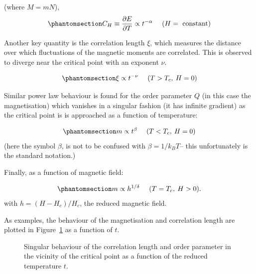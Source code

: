\documentclass[
  letterpaper,
  enabledeprecatedfontcommands]{report}
\begin{document}
(where \(M=mN\)), \begin{equation}\phantomsection\label{eq-Cv}{
C_H \equiv \frac{\partial E}{\partial T}\propto t^{-\alpha} ~~~~ (H=\textrm{ constant}) 
}\end{equation}

Another key quantity is the correlation length \(\xi\), which measures
the distance over which fluctuations of the magnetic moments are
correlated. This is observed to diverge near the critical point with an
exponent \(\nu\).

\begin{equation}\phantomsection\label{eq-corr}{
\xi \propto t^{-\nu} ~~~~ (T > T_c,\: H=0)
}\end{equation}

Similar power law behaviour is found for the order parameter \(Q\) (in
this case the magnetisation) which vanishes in a singular fashion (it
has infinite gradient) as the critical point is is approached as a
function of temperature:

\begin{equation}\phantomsection\label{eq-mag}{
m \propto t^{\beta} ~~~~ (T < T_c,\: H=0) 
}\end{equation} (here the symbol \(\beta\), is not to be confused with
\(\beta=1/k_BT\)-- this unfortunately is the standard notation.)

Finally, as a function of magnetic field:

\begin{equation}\phantomsection\label{eq-field}{m \propto h^{1/\delta} ~~~~ (T = T_c,\: H>0) .}\end{equation}
with \(h=(H-H_c)/H_c\), the reduced magnetic field.

As examples, the behaviour of the magnetisation and correlation length
are plotted in Figure~\ref{fig-sing} as a function of \(t\).

\begin{figure}


\caption{\label{fig-sing}Singular behaviour of the correlation length
and order parameter in the vicinity of the critical point as a function
of the reduced temperature \(t\).}

\end{figure}%
\end{document}
